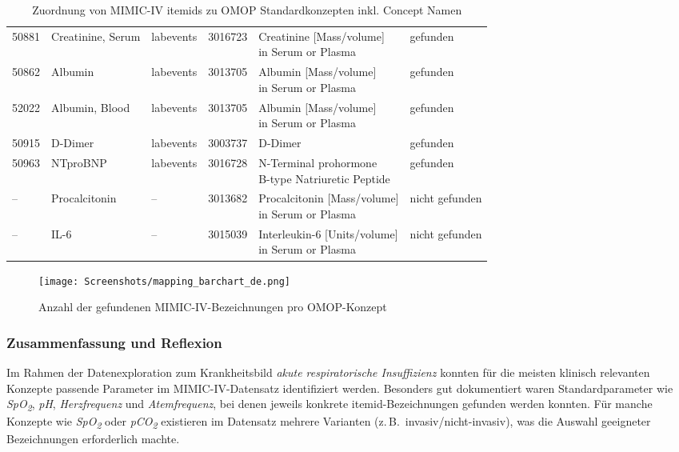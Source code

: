 \documentclass[12pt]{article}
\begin{document}
\begin{table}[H]
\begin{tabular}{p{1.2cm} p{3cm} p{1.8cm} p{1.6cm} p{4.6cm} p{2cm}}
50881  & Creatinine, Serum & labevents & 3016723 & \makecell[l]{Creatinine [Mass/volume]\\ in Serum or Plasma} & gefunden \\
50862  & Albumin & labevents & 3013705 & \makecell[l]{Albumin [Mass/volume]\\ in Serum or Plasma} & gefunden \\
52022  & Albumin, Blood & labevents & 3013705 & \makecell[l]{Albumin [Mass/volume]\\ in Serum or Plasma} & gefunden \\
50915  & D-Dimer & labevents & 3003737 & D-Dimer & gefunden \\
50963  & NTproBNP & labevents & 3016728 & \makecell[l]{N-Terminal prohormone\\ B-type Natriuretic Peptide} & gefunden \\
–      & Procalcitonin & – & 3013682 & \makecell[l]{Procalcitonin [Mass/volume]\\ in Serum or Plasma} & nicht gefunden \\
–      & IL-6 & – & 3015039 & \makecell[l]{Interleukin-6 [Units/volume]\\ in Serum or Plasma} & nicht gefunden \\
\bottomrule
\end{tabular}
\caption{Zuordnung von MIMIC-IV itemids zu OMOP Standardkonzepten inkl. Concept Namen}
\label{tab:mimic_omop_combined}
\end{table}



\begin{figure}[H]
  \centering
  \texttt{[image: Screenshots/mapping\_barchart\_de.png]}
 \caption{Anzahl der gefundenen MIMIC-IV-Bezeichnungen pro OMOP-Konzept}
\end{figure}

\vspace{8mm}
\subsubsection{Zusammenfassung und Reflexion}

Im Rahmen der Datenexploration zum Krankheitsbild \textit{akute respiratorische Insuffizienz} konnten für die meisten klinisch relevanten Konzepte passende Parameter im MIMIC-IV-Datensatz identifiziert werden.
Besonders gut dokumentiert waren Standardparameter wie \textit{SpO\textsubscript{2}}, \textit{pH}, \textit{Herzfrequenz} und \textit{Atemfrequenz}, bei denen jeweils konkrete itemid-Bezeichnungen gefunden werden konnten. Für manche Konzepte wie \textit{SpO\textsubscript{2}} oder \textit{pCO\textsubscript{2}} existieren im Datensatz mehrere Varianten (z.\,B.\ invasiv/nicht-invasiv), was die Auswahl geeigneter Bezeichnungen erforderlich machte.
\end{document}
